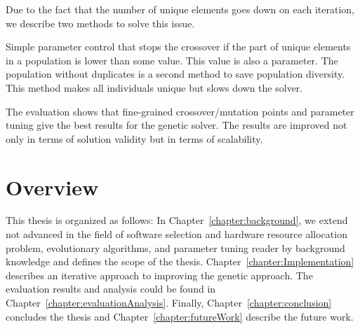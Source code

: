 Due to the fact that the number of unique elements goes down on each iteration, we describe two methods to solve this issue.

Simple parameter control that stops the crossover if the part of unique elements in a population is lower than some value. This value is also a parameter. 
The population without duplicates is a second method to save population diversity. This method makes all individuals unique but slows down the solver.

The evaluation shows that fine-grained crossover/mutation points and parameter tuning give the best results for the genetic solver.
The results are improved not only in terms of solution validity but in terms of scalability.


\section{Overview}
This thesis is organized as follows: In Chapter~\ref{chapter:background}, we extend not advanced in the field of software selection and hardware resource allocation problem, evolutionary algorithms, and parameter tuning reader by background knowledge and defines the scope of the thesis. Chapter~\ref{chapter:Implementation} describes an iterative approach to improving the genetic approach. The evaluation results and analysis could be found in Chapter~\ref{chapter:evaluationAnalysis}. Finally, Chapter~\ref{chapter:conclusion} concludes the thesis and Chapter~\ref{chapter:futureWork} describe the future work.
